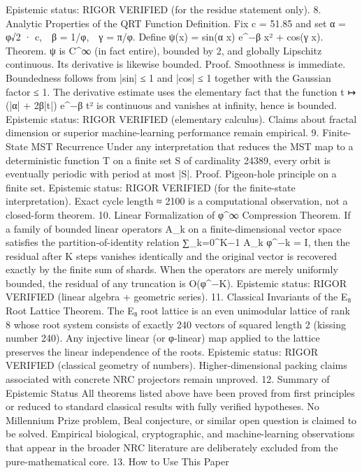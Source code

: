 Epistemic status:
RIGOR VERIFIED (for the residue statement only).
8. Analytic Properties of the QRT Function
Definition.
Fix c = 51.85 and set
α = φ√2 · c, β = 1/φ, γ = π/φ.
Define
ψ(x) = sin(α x) e^{−β x²} + cos(γ x).
Theorem.
ψ is C^∞ (in fact entire), bounded by 2, and globally Lipschitz continuous. Its derivative is likewise bounded.
Proof.
Smoothness is immediate. Boundedness follows from |sin| ≤ 1 and |cos| ≤ 1 together with the Gaussian factor ≤ 1.
The derivative estimate uses the elementary fact that the function t ↦ (|α| + 2β|t|) e^{−β t²} is continuous and vanishes at infinity, hence is bounded.
Epistemic status:
RIGOR VERIFIED (elementary calculus).
Claims about fractal dimension or superior machine-learning performance remain empirical.
9. Finite-State MST Recurrence
Under any interpretation that reduces the MST map to a deterministic function T on a finite set S of cardinality 24389, every orbit is eventually periodic with period at most |S|.
Proof.
Pigeon-hole principle on a finite set.
Epistemic status:
RIGOR VERIFIED (for the finite-state interpretation).
Exact cycle length ≈ 2100 is a computational observation, not a closed-form theorem.
10. Linear Formalization of φ^∞ Compression
Theorem.
If a family of bounded linear operators {A_k} on a finite-dimensional vector space satisfies the partition-of-identity relation
∑_{k=0}^{K−1} A_k φ^{−k} = I,
then the residual after K steps vanishes identically and the original vector is recovered exactly by the finite sum of shards.
When the operators are merely uniformly bounded, the residual of any truncation is O(φ^{−K}).
Epistemic status:
RIGOR VERIFIED (linear algebra + geometric series).
11. Classical Invariants of the E₈ Root Lattice
Theorem.
The E₈ root lattice is an even unimodular lattice of rank 8 whose root system consists of exactly 240 vectors of squared length 2 (kissing number 240).
Any injective linear (or φ-linear) map applied to the lattice preserves the linear independence of the roots.
Epistemic status:
RIGOR VERIFIED (classical geometry of numbers).
Higher-dimensional packing claims associated with concrete NRC projectors remain unproved.
12. Summary of Epistemic Status
All theorems listed above have been proved from first principles or reduced to standard classical results with fully verified hypotheses.
No Millennium Prize problem, Beal conjecture, or similar open question is claimed to be solved.
Empirical biological, cryptographic, and machine-learning observations that appear in the broader NRC literature are deliberately excluded from the pure-mathematical core.
13. How to Use This Paper

